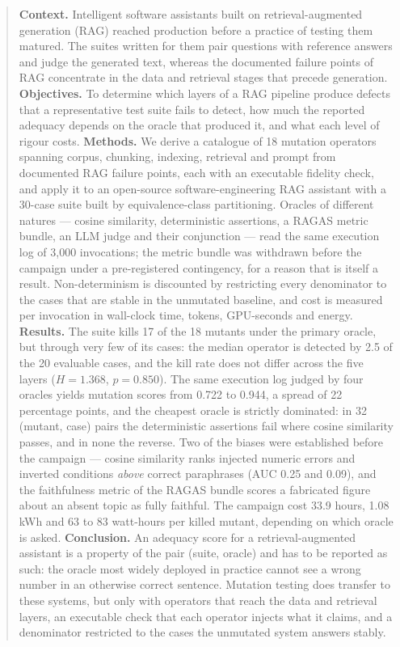 \documentclass[a4paper,fleqn]{cas-dc}
\begin{document}
\begin{abstract}
\textbf{Context.} Intelligent software assistants built on retrieval-augmented
generation (RAG) reached production before a practice of testing them matured.
The suites written for them pair questions with reference answers and judge the
generated text, whereas the documented failure points of RAG concentrate in the
data and retrieval stages that precede generation.
\textbf{Objectives.} To determine which layers of a RAG pipeline produce defects
that a representative test suite fails to detect, how much the reported
adequacy depends on the oracle that produced it, and what each level of rigour
costs.
\textbf{Methods.} We derive a catalogue of 18 mutation operators spanning
corpus, chunking, indexing, retrieval and prompt from documented RAG failure
points, each with an executable fidelity check, and apply it to an open-source
software-engineering RAG assistant with a 30-case suite built by
equivalence-class partitioning. Oracles of different natures --- cosine
similarity, deterministic assertions, a RAGAS metric bundle, an LLM judge and
their conjunction --- read the same execution log of 3,000 invocations; the
metric bundle was withdrawn before the campaign under a pre-registered
contingency, for a reason that is itself a result.
Non-determinism is discounted by restricting every denominator to the cases that
are stable in the unmutated baseline, and cost is measured per invocation in
wall-clock time, tokens, GPU-seconds and energy.
\textbf{Results.} The suite kills 17 of the 18 mutants under the primary
oracle, but through very few of its cases: the median operator is detected by
2.5 of the 20 evaluable cases, and the kill rate does not differ across the
five layers ($H = 1.368$, $p = 0.850$). The same execution log judged by four
oracles yields mutation scores from 0.722 to 0.944, a spread of 22 percentage
points, and the cheapest oracle is strictly dominated: in 32 (mutant, case)
pairs the deterministic assertions fail where cosine similarity passes, and in
none the reverse. Two of the biases were established before the campaign ---
cosine similarity ranks injected numeric errors and inverted conditions
\emph{above} correct paraphrases (AUC 0.25 and 0.09), and the faithfulness
metric of the RAGAS bundle scores a fabricated figure about an absent topic as
fully faithful. The campaign cost 33.9 hours, 1.08 kWh and 63 to 83 watt-hours
per killed mutant, depending on which oracle is asked.
\textbf{Conclusion.} An adequacy score for a retrieval-augmented assistant
is a property of the pair (suite, oracle) and has to be reported as such: the
oracle most widely deployed in practice cannot see a wrong number in an
otherwise correct sentence. Mutation testing does transfer to these systems,
but only with operators that reach the data and retrieval layers, an executable
check that each operator injects what it claims, and a denominator restricted
to the cases the unmutated system answers stably.
\end{abstract}
\end{document}
